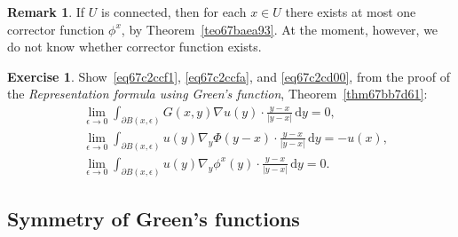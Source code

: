 \documentclass[a4paper,9pt]{amsart}
\newcommand{\did}{\,\mathrm{d}}	%
\newcommand{\de}{\partial}		%
\newcommand{\grad}{\nabla}
\theoremstyle{plain}
\theoremstyle{definition}
\newtheorem{remark}[proposition]{Remark}
\newtheorem{exercise}[proposition]{Exercise}%
\theoremstyle{remark}
\begin{document}
\begin{remark}
	If $U$ is connected, then for each $x\in U$ there exists at most one corrector function $\phi^x$,
	by Theorem~\ref{teo67baea93}.
	At the moment, however, we do not know whether corrector function exists.
\end{remark}

\begin{exercise}
	Show~\eqref{eq67c2ccf1}, \eqref{eq67c2ccfa}, and \eqref{eq67c2cd00}, 
	from the proof of the {\it Representation formula using Green's function}, Theorem~\ref{thm67bb7d61}:
	\begin{align*}
		&\lim_{\epsilon\to0}
			\int_{\de B(x,\epsilon)}  G(x,y) \grad u(y)\cdot\frac{y-x}{|y-x|} \did y 
			= 0 ,\\
		&\lim_{\epsilon\to0}
			\int_{\de B(x,\epsilon)} u(y) \grad_y \Phi(y-x)\cdot\frac{y-x}{|y-x|} \did y 
			= - u(x) ,\\
		&\lim_{\epsilon\to0}
			\int_{\de B(x,\epsilon)} u(y) \grad_y \phi^x(y)\cdot\frac{y-x}{|y-x|} \did y 
			=0 .
	\end{align*}
\end{exercise}

\subsection{Symmetry of Green's functions}\label{subs67c2ce55}
\end{document}
